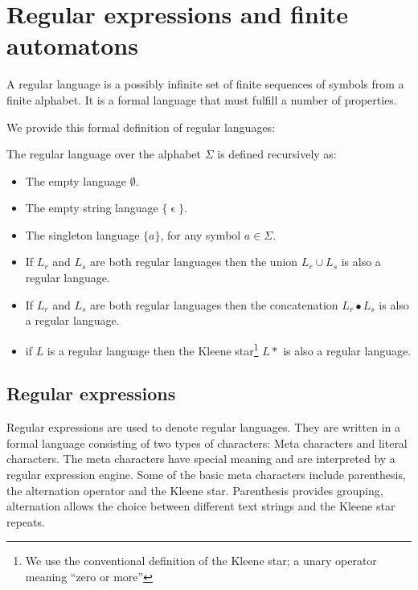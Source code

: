 \section{Regular expressions and finite automatons}
\label{sec:regular_finite}

A regular language is a possibly infinite set of finite sequences of
symbols from a finite alphabet. It is a formal language that must
fulfill a number of properties.


We provide this formal definition of regular languages:
\begin{definition}
  The regular language over the alphabet $\Sigma$ is defined
  recursively as:
  \begin{itemize}
  \item The empty language $\emptyset$.
  \item The empty string language $\{\upvarepsilon\}$.
  \item The singleton language $\{a\}$, for any symbol $a\in \Sigma$.
  \item If $L_r$ and $L_s$ are both regular languages then the union
    $L_r \cup L_s$ is also a regular language.
  \item If $L_r$ and $L_s$ are both regular languages then the
    concatenation $L_r \bullet L_s$ is also a regular language.
  \item if $L$ is a regular language then the Kleene star\footnote{We use the conventional definition of the Kleene star; a unary operator meaning ``zero or more'' } $L*$ is also
    a regular language.
  \end{itemize}
\end{definition}



\subsection{Regular expressions}

Regular expressions are used to denote regular languages. They are
written in a formal language consisting of two types of characters:
Meta characters and literal characters. The meta characters have
special meaning and are interpreted by a regular expression
engine. Some of the basic meta characters include parenthesis, the alternation
operator and the Kleene star. Parenthesis provides grouping,
alternation allows the choice between different text strings and the
Kleene star repeats. 

